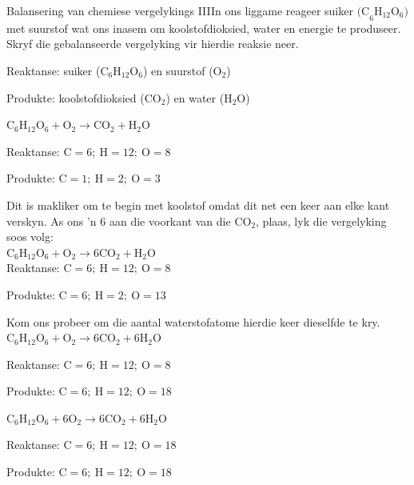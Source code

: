 \begin{wex}{Balansering van chemiese vergelykings III}{In ons liggame reageer suiker ${\text{(C}_{6}\text{H}_{12}\text{O}_{6}\text{)}}$ met suurstof wat ons inasem om koolstofdioksied, water en energie te produseer. Skryf die gebalanseerde vergelyking vir hierdie reaksie neer.}

{
Reaktanse: suiker (${\text{C}_{6}\text{H}_{12}\text{O}_{6}}$) en suurstof (${\text{O}_{2}}$)

Produkte: koolstofdioksied (${\text{CO}_{2}}$) en water (${\text{H}_{2}\text{O}}$)\\
}
{
    $\text{C}_{6}\text{H}_{12}\text{O}_{6} + \text{O}_{2} \rightarrow \text{CO}_{2} + \text{H}_{2}\text{O}$
}
{
   Reaktanse: $\text{C} = 6;~ \text{H} = 12; ~\text{O} = 8$

   Produkte: $\text{C} = 1;~ \text{H} = 2; ~\text{O} = 3$
}
{
Dit is makliker om te begin met koolstof omdat dit net een keer aan elke kant verskyn. As ons 'n $6$ aan die                                      voorkant van die ${\text{CO}_{2}}$, plaas, lyk die vergelyking soos volg:\\
    $\text{C}_{6}\text{H}_{12}\text{O}_{6} + \text{O}_{2} \rightarrow 6\text{CO}_{2} + \text{H}_{2}\text{O}$\\

   Reaktanse: $\text{C} = 6;~ \text{H} = 12; ~\text{O} = 8$

   Produkte: $\text{C} = 6;~ \text{H} = 2; ~\text{O} = 13$
}
{
Kom ons probeer om die aantal waterstofatome hierdie keer dieselfde te kry.\\
    $\text{C}_{6}\text{H}_{12}\text{O}_{6} + \text{O}_{2} \rightarrow 6\text{CO}_{2} + 6\text{H}_{2}\text{O}$

   Reaktanse: $\text{C} = 6;~ \text{H} = 12; ~\text{O} = 8$

   Produkte: $\text{C} = 6;~ \text{H} = 12; ~\text{O} = 18$
}
{
  $\text{C}_{6}\text{H}_{12}\text{O}_{6} + 6\text{O}_{2} \rightarrow 6\text{CO}_{2} + 6\text{H}_{2}\text{O}$

   Reaktanse: $\text{C} = 6;~ \text{H} = 12; ~\text{O} = 18$

   Produkte: $\text{C} = 6;~ \text{H} = 12; ~\text{O} = 18$
}
\end{wex}
